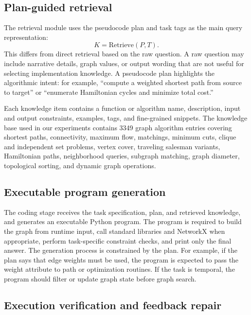 \documentclass[pdflatex,sn-mathphys-num]{sn-jnl}
\theoremstyle{thmstyleone}
\theoremstyle{thmstyletwo}
\theoremstyle{thmstylethree}
\begin{document}
\subsection{Plan-guided retrieval}

The retrieval module uses the pseudocode plan and task tags as the main query representation:
\begin{equation}
K=\mathrm{Retrieve}(P,T).
\end{equation}
This differs from direct retrieval based on the raw question. A raw question may include narrative details, graph values, or output wording that are not useful for selecting implementation knowledge. A pseudocode plan highlights the algorithmic intent: for example, ``compute a weighted shortest path from source to target'' or ``enumerate Hamiltonian cycles and minimize total cost.''

Each knowledge item contains a function or algorithm name, description, input and output constraints, examples, tags, and fine-grained snippets. The knowledge base used in our experiments contains 3349 graph algorithm entries covering shortest paths, connectivity, maximum flow, matchings, minimum cuts, clique and independent set problems, vertex cover, traveling salesman variants, Hamiltonian paths, neighborhood queries, subgraph matching, graph diameter, topological sorting, and dynamic graph operations.

\subsection{Executable program generation}

The coding stage receives the task specification, plan, and retrieved knowledge, and generates an executable Python program. The program is required to build the graph from runtime input, call standard libraries and NetworkX when appropriate, perform task-specific constraint checks, and print only the final answer. The generation process is constrained by the plan. For example, if the plan says that edge weights must be used, the program is expected to pass the weight attribute to path or optimization routines. If the task is temporal, the program should filter or update graph state before graph search.

\subsection{Execution verification and feedback repair}
\end{document}
